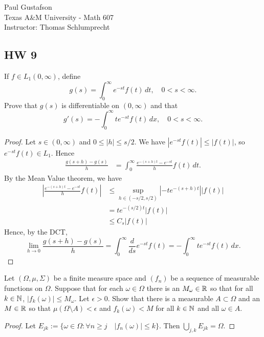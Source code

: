 \documentclass{article}
\begin{document}
\noindent Paul Gustafson\\
\noindent Texas A\&M University - Math 607\\ 
\noindent Instructor: Thomas Schlumprecht

\subsection*{HW 9}
 If $f \in L_1(0,\infty)$, define
$$g(s) = \int_0^\infty e^{-st}f(t) \,dt, \quad 0 < s < \infty.$$
Prove that $g(s)$ is differentiable on $(0,\infty)$ and that
$$g'(s) = - \int_0^\infty t e^{-st} f(t) \, dx, \quad 0 < s < \infty.$$
\begin{proof}
Let $s \in (0,\infty)$ and $0 \le |h| \le s/2$. We have $|e^{-st}f(t)| \le |f(t)|$, so $e^{-st}f(t) \in L_1$. Hence 
\begin{align*}
\frac { g(s + h) - g(s)} h & = \int_0^\infty \frac {e^{-(s+h)t} - e^{-st}} h  f(t) \,dt.
\end{align*}
By the Mean Value theorem, we have  
\begin{align*}
\left|\frac {e^{-(s+h)t} - e^{-st}} h f(t)\right| & \le \sup_{h \in (-s/2,s/2)} |-t e^{-(s+h)t}| \left|f(t)\right|
\\ & = t e^{-(s/2)t} |f(t)|
\\ &  \le C_s |f(t)|
\end{align*}
Hence, by the DCT,
$$\lim_{h \to 0} \frac { g(s + h) - g(s)} h = \int_0^\infty \frac d {ds} e^{-st} f(t) = - \int_0^\infty t e^{-st} f(t) \, dx. $$
\end{proof}

 Let $(\Omega, \mu, \Sigma)$ be a finite measure space and $(f_n)$ be a sequence of measurable functions on $\Omega$. Suppose that for each $\omega \in \Omega$ there is an $M_\omega \in \mathbb{R}$ so that for all $k \in \mathbb{N}$, $|f_k(\omega)| \le M_\omega$. Let $\epsilon > 0$. Show that there is a measurable $A \subset \Omega$ and an $M \in \mathbb{R}$ so that $\mu(\Omega \setminus A) < \epsilon$ and $f_k(\omega) < M$ for all $k \in \mathbb{N}$ and all $\omega \in A$.
\begin{proof}
Let $E_{jk} := \{ \omega \in \Omega : \forall n \ge j \quad |f_n(\omega)| \le k \}$.  Then $\bigcup_{j,k} E_{jk} = \Omega$.




























\end{proof}
\end{document}
